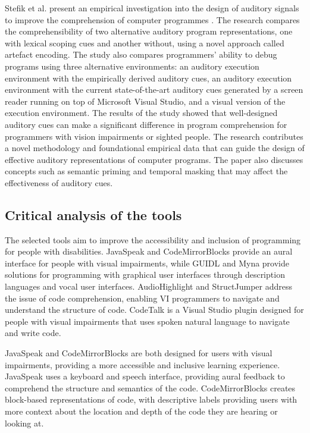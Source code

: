 \documentclass{l4proj}
\begin{document}
Stefik et al. present an empirical investigation into the design of auditory signals to improve the comprehension of computer programmes \cite{Stefik_Hundhausen_Patterson_2011}. The research compares the comprehensibility of two alternative auditory program representations, one with lexical scoping cues and another without, using a novel approach called artefact encoding. The study also compares programmers' ability to debug programs using three alternative environments: an auditory execution environment with the empirically derived auditory cues, an auditory execution environment with the current state-of-the-art auditory cues generated by a screen reader running on top of Microsoft Visual Studio, and a visual version of the execution environment. The results of the study showed that well-designed auditory cues can make a significant difference in program comprehension for programmers with vision impairments or sighted people. The research contributes a novel methodology and foundational empirical data that can guide the design of effective auditory representations of computer programs. The paper also discusses concepts such as semantic priming and temporal masking that may affect the effectiveness of auditory cues.

\subsection{Critical analysis of the tools}
The selected tools aim to improve the accessibility and inclusion of programming for people with disabilities. JavaSpeak and CodeMirrorBlocks provide an aural interface for people with visual impairments, while GUIDL and Myna provide solutions for programming with graphical user interfaces through description languages and vocal user interfaces. AudioHighlight and StructJumper address the issue of code comprehension, enabling VI programmers to navigate and understand the structure of code. CodeTalk is a Visual Studio plugin designed for people with visual impairments that uses spoken natural language to navigate and write code.

JavaSpeak and CodeMirrorBlocks are both designed for users with visual impairments, providing a more accessible and inclusive learning experience. JavaSpeak uses a keyboard and speech interface, providing aural feedback to comprehend the structure and semantics of the code. CodeMirrorBlocks creates block-based representations of code, with descriptive labels providing users with more context about the location and depth of the code they are hearing or looking at.
\end{document}
